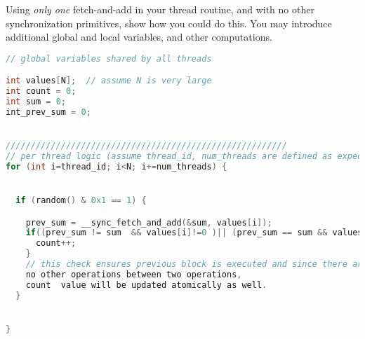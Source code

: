 \documentclass[11pt]{article}
\newenvironment{choice}{\begin{enumerate}[A.]}{\end{enumerate}}
\begin{document}
\begin{choice}
Using {\em only one} fetch-and-add in your
thread routine, and with no other synchronization primitives, show how you could
do this.  You may introduce additional global and local variables,
and other computations.

\begin{lstlisting}[language=C]
// global variables shared by all threads

int values[N];  // assume N is very large
int count = 0;
int sum = 0;
int_prev_sum = 0;


////////////////////////////////////////////////////////
// per thread logic (assume thread_id, num_threads are defined as expected)
for (int i=thread_id; i<N; i+=num_threads) {


  if (random() & 0x1 == 1) {  

    prev_sum = __sync_fetch_and_add(&sum, values[i]);
    if((prev_sum != sum  && values[i]!=0 )|| (prev_sum == sum && values[i]==0)){
      count++;
    }
    // this check ensures previous block is executed and since there are
    no other operations between two operations,
    count  value will be updated atomically as well.
  }


}
\end{lstlisting}



\end{choice}
\newpage 
\end{document}
